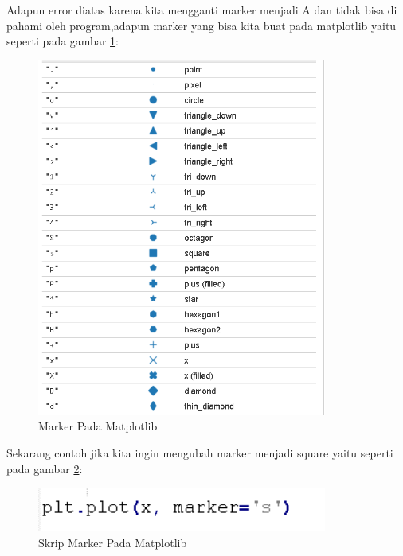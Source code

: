 Adapun error diatas karena kita mengganti marker menjadi A dan tidak bisa di pahami oleh program,adapun marker yang bisa kita buat pada matplotlib yaitu seperti pada gambar \ref{fig:markermat}:
\begin{figure}[!htbp]
	\centerline{\includegraphics[width=0.85\textwidth]{figures/6/markermat.PNG}}
	\caption{Marker Pada Matplotlib}
	\label{fig:markermat}
\end{figure} 

Sekarang contoh jika kita ingin mengubah marker menjadi square yaitu seperti pada gambar \ref{fig:lstmar}:
\begin{figure}[!htbp]
	\centerline{\includegraphics[width=0.85\textwidth]{figures/6/lstmar.PNG}}
	\caption{Skrip Marker Pada Matplotlib}
	\label{fig:lstmar}
\end{figure} 

